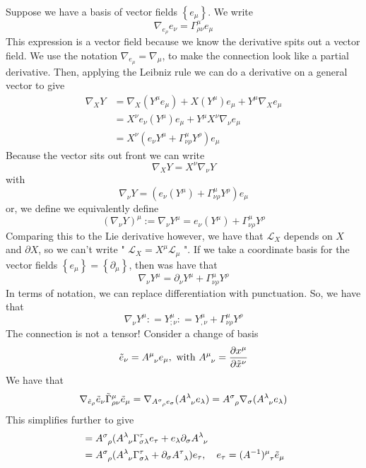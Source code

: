 \documentclass[11pt, a4paper]{article}   	%
\theoremstyle{slplain}
\begin{document}
Suppose we have a basis of vector fields $ \left\{  e_ \mu  \right\} $. 
We write 
\[
 \nabla _{ e _ \rho } e_{ \nu } = \Gamma^ \mu _{ \rho \nu } e _{ \mu } 
\] This expression is a vector field because we know 
the derivative spits out a vector field.
We use the notation $ \nabla _{ e _ \mu }  = \nabla _ \mu $, 
to make the connection look like a partial derivative. Then, applying the 
Leibniz rule we can do a derivative on a general vector to give 
\begin{align*}
	\nabla _ X Y & = \nabla _ X ( Y ^ \mu e_{\mu  } ) + X ( Y ^ \mu ) e_\mu + Y ^\mu \nabla _ X e _\mu \\
		     &=  X ^ \nu e_\nu ( Y ^\mu ) e _\mu + Y ^\mu X^\nu \nabla _ \nu e _ \mu  \\
		     &=  X ^ \nu ( e _ \nu Y ^ \mu  + \Gamma^\mu _{ \nu \rho } Y ^ \rho ) e _ \mu  
\end{align*}
Because the vector sits out front we can write 
\[
 \nabla _ X Y  = X^ \nu \nabla _ \nu  Y 
\]  with 
\[
	\nabla _ \nu Y = ( e _ \nu ( Y ^ \mu ) + \Gamma^ \mu _{ \nu \rho } Y ^ \rho ) e _ \mu 
\] or, we define we equivalently define 
\[
	( \nabla _ \nu Y ) ^ \mu := \nabla _ \nu Y ^ \mu = e _ \nu ( Y ^ \mu ) + \Gamma ^ \mu _{ \nu \rho } Y ^ \rho 
\] Comparing this to the Lie derivative however, 
we have that $ \mathcal{ L } _ X $ depends on $ X $ and $ \partial X $,
so we can't write " $ \mathcal{ L }_ X = X ^ \mu \mathcal{ L } _ \mu $ ". 
If we take a coordinate basis 
for the vector fields $ \left\{  e _  \mu  \right\}  = \left\{  \partial  _ \mu  \right\} $, 
then was have that 
\[
 \nabla _ \nu Y ^ \mu = \partial  _ \nu Y ^ \mu + \Gamma ^ \mu _{ \nu \rho } Y ^ \rho 
\] In terms of notation, we can replace differentiation with  
punctuation. So, we have that 
\[
 \nabla _ \nu Y ^ \mu : = Y ^ \mu _{ ; \nu } : = Y ^ \mu_{ , \nu } + \Gamma^ \mu _{ \nu \rho } Y ^ \rho 
\] 
The connection is not a tensor! Consider a change of basis 
\[
	\tilde{ e } _ \nu = A \indices{ ^\mu _\nu } e_\mu, \text{ with } A \indices{ ^\mu _\nu} = \frac{\partial x^\mu }{\partial \tilde{x} ^\nu}    
\]  
We have that 
\[
\nabla _{ \tilde{e } _ \rho  } \tilde{ e } _ \nu \tilde{ \Gamma } ^ \mu _{ \rho \nu } \tilde{ e } _ \mu  = \nabla _{ A \indices{ ^\sigma _ \rho } e _ \sigma  } ( A \indices{ ^ \lambda _ \nu } e _ \lambda )  = A \indices{ ^ \sigma _ \rho } \nabla _ \sigma ( A \indices{ ^ \lambda _ \nu  } e _ \lambda  )        
\]  This simplifies further to give 
\begin{align*}
	&=  A \indices{ ^ \sigma _ \rho } ( A \indices{ ^ \lambda _ \nu  } \Gamma ^ \tau _{ \sigma \lambda  } e _ \tau + e _ \lambda \partial  _ \sigma A \indices{ ^ \lambda _ \nu }     \\
	&=  A \indices{ ^ \sigma _ \rho } ( A \indices{ ^ \lambda _ \nu } \Gamma ^ \tau _{ \sigma \lambda } + \partial  _ \sigma A \indices{ ^ \tau _ \lambda } ) e _ \tau     , \quad e _ \tau = ( A^{ -1 } ) \indices{ ^ \mu _ \tau  } \tilde{ e } _ \mu  	 
\end{align*}
\end{document}
